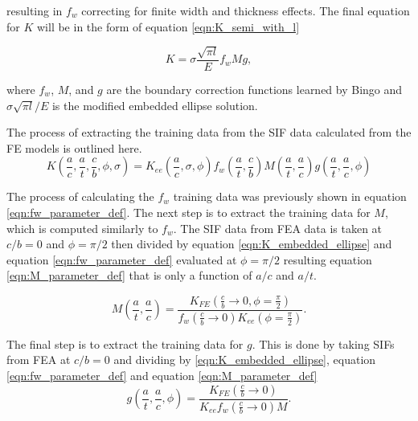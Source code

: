 resulting in $f_w$ correcting for finite width and thickness effects. The final equation for $K$ will be in the form of equation \ref{eqn:K_semi_with_l} 

\begin{equation} \label{eqn:K_semi_with_l}
    K = \sigma \frac{\sqrt{\pi l}}{E} f_w M g,
\end{equation}

where $f_w$, $M$, and $g$ are the boundary correction functions learned by Bingo and $\sigma \sqrt{\pi l}/E$ is the modified embedded ellipse solution. 


The process of extracting the training data from the SIF data calculated from the FE models is outlined here.
\begin{equation} \label{eqn:K_parameter_def}
    K\left(\frac{a}{c}, \frac{a}{t}, \frac{c}{b}, \phi, \sigma \right) = K_{ee} \left(
\frac{a}{c}, \sigma, \phi \right) f_w \left(\frac{a}{t}, \frac{c}{b} \right) M \left(\frac{a}{t}, \frac{a}{c} \right) g \left(\frac{a}{t}, \frac{a}{c}, \phi \right)
\end{equation}

The process of calculating the $f_w$ training data was previously shown in equation \ref{eqn:fw_parameter_def}. The next step is to extract the training data for $M$, which is computed similarly to $f_w$. The SIF data from FEA data is taken at $c/b = 0$ and $\phi = \pi/2$ then divided by equation \ref{eqn:K_embedded_ellipse} and equation \ref{eqn:fw_parameter_def} evaluated at $\phi = \pi/2$ resulting equation \ref{eqn:M_parameter_def} that is only a function of $a/c$ and $a/t$. 

\begin{equation} \label{eqn:M_parameter_def}
    M \left(\frac{a}{t}, \frac{a}{c} \right) = \frac{K_{FE}\left(\frac{c}{b} \rightarrow 0, \phi=\frac{\pi}{2}\right)}{f_w\left(\frac{c}{b} \rightarrow 0\right) K_{ee}\left(\phi = \frac{\pi}{2} \right)}.
\end{equation}

The final step is to extract the training data for $g$. This is done by taking SIFs from FEA at $c/b = 0$ and dividing by \ref{eqn:K_embedded_ellipse}, equation \ref{eqn:fw_parameter_def} and equation \ref{eqn:M_parameter_def}
\begin{equation} \label{eqn:g_parameter_def}
    g \left(\frac{a}{t}, \frac{a}{c}, \phi \right) = \frac{K_{FE}\left(\frac{c}{b} \rightarrow 0\right)}{K_{ee} f_w\left(\frac{c}{b} \rightarrow 0\right) M }.
\end{equation}

